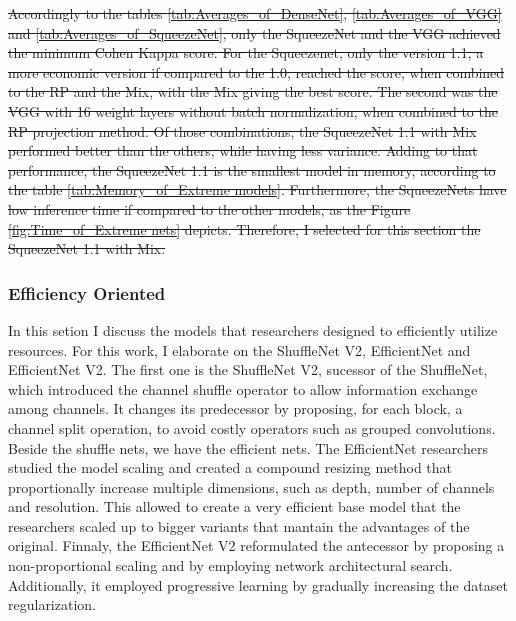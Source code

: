 \sout{
Accordingly to the tables \ref{tab:Averages_of_DenseNet}, \ref{tab:Averages_of_VGG} and \ref{tab:Averages_of_SqueezeNet}, only the SqueezeNet and the VGG achieved the minimum Cohen Kappa score. For the Squeezenet, only the version 1.1, a more economic version if compared to the 1.0, reached the score, when combined to the \gls{RP} and the \gls{Mix}, with the \gls{Mix} giving the best score. The second was the VGG with 16 weight layers without batch normalization, when combined to the \gls{RP} projection method. Of those combinations, the SqueezeNet 1.1 with \gls{Mix} performed better than the others, while having less variance. Adding to that performance, the SqueezeNet 1.1 is the smallest model in memory, according to the table \ref{tab:Memory_of_Extreme models}. Furthermore, the SqueezeNets have low inference time if compared to the other models, as the Figure \ref{fig:Time_of_Extreme nets} depicts. Therefore, I selected for this section the SqueezeNet 1.1 with \gls{Mix}.
}






\FloatBarrier

\subsubsection{Efficiency Oriented}

In this setion I discuss the models that researchers designed to efficiently utilize resources. For this work, I elaborate on the ShuffleNet V2, EfficientNet and EfficientNet V2. The first one is the ShuffleNet V2, sucessor of the ShuffleNet, which introduced the channel shuffle operator to allow information exchange among channels. It changes its predecessor by proposing, for each block, a channel split operation, to avoid costly operators such as grouped convolutions. Beside the shuffle nets, we have the efficient nets. The EfficientNet researchers studied the model scaling and created a compound resizing method that proportionally increase multiple dimensions, such as depth, number of channels and resolution. This allowed to create a very efficient base model that the researchers scaled up to bigger variants that mantain the advantages of the original. Finnaly, the EfficientNet V2 reformulated the antecessor by proposing a non-proportional scaling and by employing network architectural search. Additionally, it employed progressive learning by gradually increasing the dataset regularization.  

